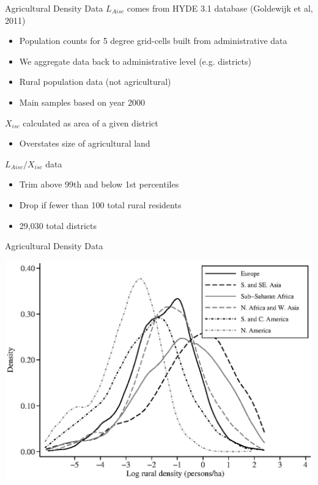 \documentclass[10pt, xcolor=dvipsnames]{beamer}
\begin{document}
\begin{frame}{Agricultural Density Data}
$L_{Aisc}$ comes from HYDE 3.1 database (Goldewijk et al, 2011)
\begin{itemize}
  \item Population counts for 5 degree grid-cells built from administrative data
  \item We aggregate data back to administrative level (e.g. districts)
  \item Rural population data (not agricultural)
  \item Main samples based on year 2000
\end{itemize}
$X_{isc}$ calculated as area of a given district
\begin{itemize}
  \item Overstates size of agricultural land
\end{itemize}
$L_{Aisc}/X_{isc}$ data 
\begin{itemize}
  \item Trim above 99th and below 1st percentiles
  \item Drop if fewer than 100 total rural residents
  \item 29,030 total districts
\end{itemize}
\end{frame}

\begin{frame}{Agricultural Density Data}
\begin{center}
\includegraphics[width=.8\textwidth]{fig_dens_rurd.eps}
\end{center}
\end{frame}
\end{document}
